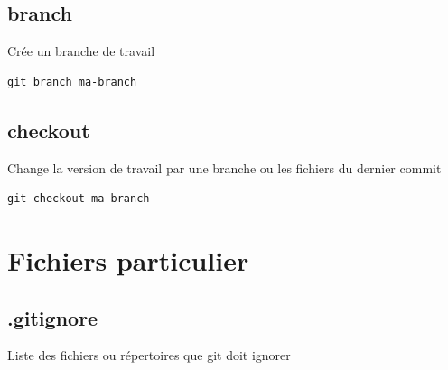 \documentclass[a4paper]{article}
\begin{document}
\subsection*{branch}
Crée un branche de travail
\begin{verbatim}
git branch ma-branch
\end{verbatim}

\subsection*{checkout}
Change la version de travail par une branche ou les fichiers du dernier commit
\begin{verbatim}
git checkout ma-branch
\end{verbatim}
\section{Fichiers particulier}

\subsection*{.gitignore}
Liste des fichiers ou répertoires que git doit ignorer
\end{document}
